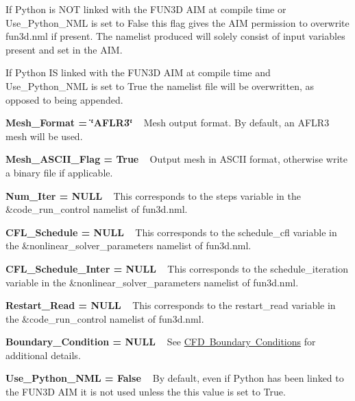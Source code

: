 \begin{DoxyItemize}
\begin{DoxyItemize}
\item If Python is NOT linked with the FUN3D AIM at compile time or Use\+\_\+\+Python\+\_\+\+NML is set to False this flag gives the AIM permission to overwrite fun3d.\+nml if present. The namelist produced will solely consist of input variables present and set in the AIM.
\item If Python IS linked with the FUN3D AIM at compile time and Use\+\_\+\+Python\+\_\+\+NML is set to True the namelist file will be overwritten, as opposed to being appended.
\end{DoxyItemize}
\item {\bfseries{Mesh\+\_\+\+Format = \char`\"{}\+AFLR3\char`\"{}}} ~\newline
 Mesh output format. By default, an AFLR3 mesh will be used.
\item {\bfseries{Mesh\+\_\+\+ASCII\+\_\+\+Flag = True}} ~\newline
 Output mesh in ASCII format, otherwise write a binary file if applicable.
\item {\bfseries{Num\+\_\+\+Iter = NULL}} ~\newline
 This corresponds to the steps variable in the \&code\+\_\+run\+\_\+control namelist of fun3d.\+nml.
\item {\bfseries{CFL\+\_\+\+Schedule = NULL}} ~\newline
 This corresponds to the schedule\+\_\+cfl variable in the \&nonlinear\+\_\+solver\+\_\+parameters namelist of fun3d.\+nml.
\item {\bfseries{CFL\+\_\+\+Schedule\+\_\+\+Inter = NULL}} ~\newline
 This corresponds to the schedule\+\_\+iteration variable in the \&nonlinear\+\_\+solver\+\_\+parameters namelist of fun3d.\+nml.
\item {\bfseries{Restart\+\_\+\+Read = NULL}} ~\newline
 This corresponds to the restart\+\_\+read variable in the \&code\+\_\+run\+\_\+control namelist of fun3d.\+nml.
\item {\bfseries{Boundary\+\_\+\+Condition = NULL }} ~\newline
 See \mbox{\hyperlink{cfdBoundaryConditions}{CFD Boundary Conditions}} for additional details.
\item {\bfseries{Use\+\_\+\+Python\+\_\+\+NML = False }} ~\newline
 By default, even if Python has been linked to the FUN3D AIM it is not used unless the this value is set to True.

\end{DoxyItemize}
